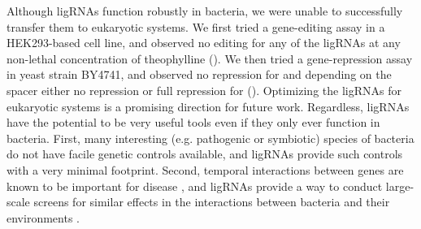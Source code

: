 \documentclass[10pt,oneside]{article}
\begin{document}
% 
% 

Although ligRNAs function robustly in bacteria, we were unable to successfully transfer them to eukaryotic systems.  We first tried a gene-editing assay in a HEK293-based cell line, and observed no editing for any of the ligRNAs at any non-lethal concentration of theophylline ().  We then tried a gene-repression assay in yeast strain BY4741, and observed no repression for \ligrnaF{} and depending on the spacer either no repression or full repression for \ligrnaB{} ().  Optimizing the ligRNAs for eukaryotic systems is a promising direction for future work.  Regardless, ligRNAs have the potential to be very useful tools even if they only ever function in bacteria.  First, many interesting (e.g. pathogenic or symbiotic) species of bacteria do not have facile genetic controls available, and ligRNAs provide such controls with a very minimal footprint.  Second, temporal interactions between genes are known to be important for disease \autocite{lee2012}, and ligRNAs provide a way to conduct large-scale screens for similar effects in the interactions between bacteria and their environments \autocite{peters2016}.
\end{document}

